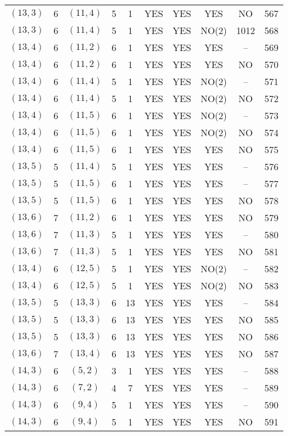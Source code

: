 \begin{longtable}{|c|c|c|c|c|c|c|c|c|c|}
$(13, 3)$ & 6 & $(11, 4)$ & 5 & 1 & YES & YES & YES & NO & 567\\
$(13, 3)$ & 6 & $(11, 4)$ & 5 & 1 & YES & YES & NO(2) & 1012 & 568\\
$(13, 4)$ & 6 & $(11, 2)$ & 6 & 1 & YES & YES & YES & -- & 569\\
$(13, 4)$ & 6 & $(11, 2)$ & 6 & 1 & YES & YES & YES & NO & 570\\
$(13, 4)$ & 6 & $(11, 4)$ & 5 & 1 & YES & YES & NO(2) & -- & 571\\
$(13, 4)$ & 6 & $(11, 4)$ & 5 & 1 & YES & YES & NO(2) & NO & 572\\
$(13, 4)$ & 6 & $(11, 5)$ & 6 & 1 & YES & YES & NO(2) & -- & 573\\
$(13, 4)$ & 6 & $(11, 5)$ & 6 & 1 & YES & YES & NO(2) & NO & 574\\
$(13, 4)$ & 6 & $(11, 5)$ & 6 & 1 & YES & YES & YES & NO & 575\\
$(13, 5)$ & 5 & $(11, 4)$ & 5 & 1 & YES & YES & YES & -- & 576\\
$(13, 5)$ & 5 & $(11, 5)$ & 6 & 1 & YES & YES & YES & -- & 577\\
$(13, 5)$ & 5 & $(11, 5)$ & 6 & 1 & YES & YES & YES & NO & 578\\
$(13, 6)$ & 7 & $(11, 2)$ & 6 & 1 & YES & YES & YES & NO & 579\\
$(13, 6)$ & 7 & $(11, 3)$ & 5 & 1 & YES & YES & YES & -- & 580\\
$(13, 6)$ & 7 & $(11, 3)$ & 5 & 1 & YES & YES & YES & NO & 581\\
$(13, 4)$ & 6 & $(12, 5)$ & 5 & 1 & YES & YES & NO(2) & -- & 582\\
$(13, 4)$ & 6 & $(12, 5)$ & 5 & 1 & YES & YES & NO(2) & NO & 583\\
$(13, 5)$ & 5 & $(13, 3)$ & 6 & 13 & YES & YES & YES & -- & 584\\
$(13, 5)$ & 5 & $(13, 3)$ & 6 & 13 & YES & YES & YES & NO & 585\\
$(13, 5)$ & 5 & $(13, 3)$ & 6 & 13 & YES & YES & YES & NO & 586\\
$(13, 6)$ & 7 & $(13, 4)$ & 6 & 13 & YES & YES & YES & NO & 587\\
$(14, 3)$ & 6 & $(5, 2)$ & 3 & 1 & YES & YES & YES & -- & 588\\
$(14, 3)$ & 6 & $(7, 2)$ & 4 & 7 & YES & YES & YES & -- & 589\\
$(14, 3)$ & 6 & $(9, 4)$ & 5 & 1 & YES & YES & YES & -- & 590\\
$(14, 3)$ & 6 & $(9, 4)$ & 5 & 1 & YES & YES & YES & NO & 591\\

\end{longtable}
